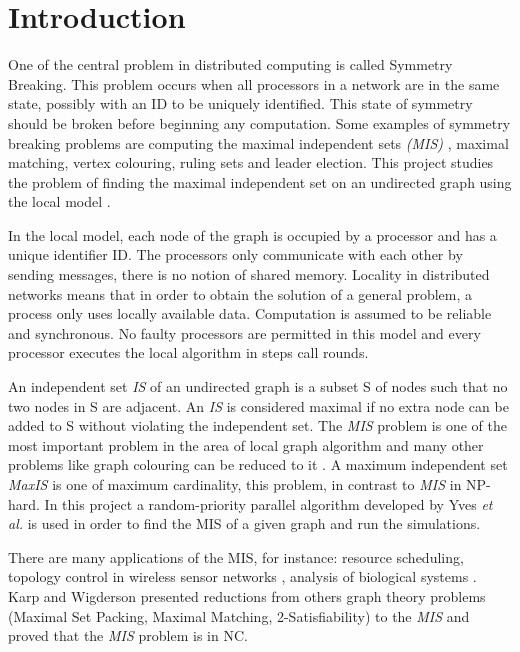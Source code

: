 \section{Introduction}
\label{cap:1}

 One of the central problem in distributed computing is called Symmetry Breaking. This problem occurs when all processors in a network are in the same state, possibly with an ID to be uniquely identified. This state of symmetry should be broken before beginning any computation. Some examples of symmetry breaking problems are computing the maximal independent sets \textit{(MIS)} , maximal matching, vertex colouring, ruling sets and leader election. This project studies the problem of finding the maximal independent set on an undirected graph using the local model \cite{linial1992locality}.

In the local model, each node of the graph is occupied by a processor and has a unique identifier ID. The processors only communicate with each other by sending messages, there is no notion of shared memory. Locality in distributed networks means that in order to obtain the solution of a general problem, a process only uses locally available data. Computation is assumed to be reliable and synchronous. No faulty processors are permitted in this model and every processor executes the local algorithm in steps call rounds.

An independent set \textit{IS} of an undirected graph is a subset S of nodes such that no two nodes in S are adjacent. An \textit{IS} is considered maximal if no extra node can be added to S without violating the independent set. The \textit{MIS} problem is one of the most important problem in the area of local graph algorithm and many other problems like graph colouring can be reduced to it \cite{panconesi1992improved}. A maximum independent set \textit{MaxIS} is one of maximum cardinality, this problem, in contrast to \textit{MIS} in NP-hard. In this project a random-priority parallel algorithm developed by Yves \textit{et al.} \cite{yves2009optimal} is used in order to find the MIS of a given graph and run the simulations.


There are many applications of the MIS, for instance: resource scheduling, topology control in wireless sensor networks \cite{basagni2001finding}, analysis of biological systems \cite{afek2013beeping}. Karp and Wigderson \cite{karp1986constructing} presented reductions from others graph theory problems (Maximal Set Packing, Maximal Matching, 2-Satisfiability) to the \textit{MIS} and proved that the \textit{MIS} problem is in NC.




